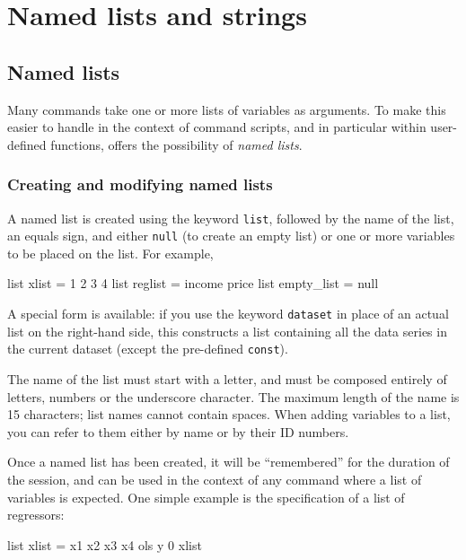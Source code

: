 \chapter{Named lists and strings}
\label{chap-persist}


\section{Named lists}
\label{named-lists}

Many  commands take one or more lists of variables as
arguments.  To make this easier to handle in the context of command
scripts, and in particular within user-defined functions, 
offers the possibility of \textit{named lists}.  

\subsection{Creating and modifying named lists}

A named list is created using the keyword \texttt{list}, followed by
the name of the list, an equals sign, and either \texttt{null} (to
create an empty list) or one or more variables to be placed on the
list.  For example,
%
\begin{code}
list xlist = 1 2 3 4
list reglist = income price 
list empty_list = null
\end{code}

A special form is available: if you use the keyword \texttt{dataset}
in place of an actual list on the right-hand side, this constructs a
list containing all the data series in the current dataset (except
the pre-defined \texttt{const}).

The name of the list must start with a letter, and must be composed
entirely of letters, numbers or the underscore character.  The maximum
length of the name is 15 characters; list names cannot contain
spaces.  When adding variables to a list, you can refer to them either
by name or by their ID numbers. 

Once a named list has been created, it will be ``remembered'' for the
duration of the  session, and can be used in the context of
any  command where a list of variables is expected.  One
simple example is the specification of a list of regressors:
%
\begin{code}
list xlist = x1 x2 x3 x4
ols y 0 xlist
\end{code}

